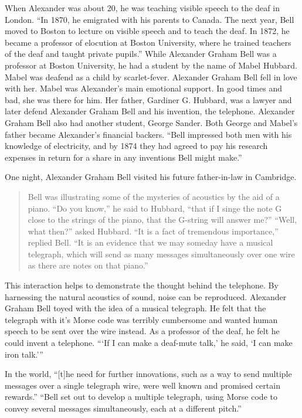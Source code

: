 \documentclass[12pt singlecol]{article}
\begin{document}
\begin{flushleft}
\begin{multicols}{2}
When Alexander was about 20, he was teaching visible speech to the deaf in London. ``In 1870, he emigrated with his parents to Canada. The next year, Bell moved to Boston to lecture on visible speech and to teach the deaf. In 1872, he became a professor of elocution at Boston University, where he trained teachers of the deaf and taught private pupils.'' \cite[para.~4]{ATT13} While Alexander Graham Bell was a professor at Boston University, he had a student by the name of Mabel Hubbard. Mabel was deafend as a child by scarlet-fever. Alexander Graham Bell fell in love with her. Mabel was Alexander's main emotional support. In good times and bad, she was there for him. \cite[p.~23]{Casson10} Her father, Gardiner G. Hubbard, was a lawyer and later defend Alexander Graham Bell and his invention, the telephone. \cite[p.~24]{Casson10} Alexander Graham Bell also had another student, George Sander. Both George and Mabel's father became Alexander's financial backers. ``Bell impressed both men with his knowledge of electricity, and by 1874 they had agreed to pay his research expenses in return for a share in any inventions Bell might make.''\cite[para.~5]{ATT13}

One night, Alexander Graham Bell visited his future father-in-law in Cambridge. 

\begin{quotation}
Bell was illustrating some of the mysteries of acoustics by the aid of a piano. ``Do you know,'' he said to Hubbard, ``that if I singe the note G close to the strings of the piano, that the G-string will answer me?'' ``Well, what then?'' asked Hubbard. ``It is a fact of tremendous importance,'' replied Bell. ``It is an evidence that we may someday have a musical telegraph, which will send as many messages simultaneously over one wire as there are notes on that piano.'' \cite[p.~24]{Casson10}
\end{quotation}

This interaction helps to demonstrate the thought behind the telephone. By harnessing the natural acoustics of sound, noise can be reproduced. Alexander Graham Bell toyed with the idea of a musical telegraph. He felt that the telegraph with it's Morse code was terribly cumbersome and wanted human speech to be sent over the wire instead. As a professor of the deaf, he felt he could invent a telephone. ```If I can make a deaf-mute talk,' he said, `I can make iron talk.''' \cite[p.~25]{Casson10} 

In the world, ``[t]he need for further innovations, such as a way to send multiple messages over a single telegraph wire, were well known and promised certain rewards.''\cite[para.~6]{ATT13} ``Bell set out to develop a multiple telegraph, using Morse code to convey several messages simultaneously, each at a different pitch.'' \cite[para.~4]{MIT00} 


\end{multicols}
\end{flushleft}
\end{document}
